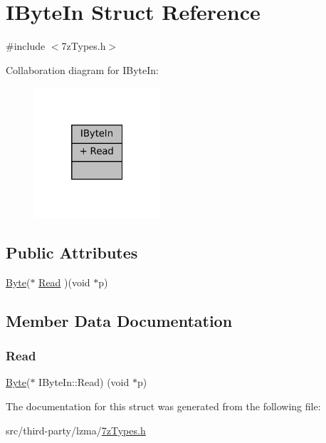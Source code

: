 \hypertarget{struct_i_byte_in}{}\section{I\+Byte\+In Struct Reference}
\label{struct_i_byte_in}


{\ttfamily \#include $<$7z\+Types.\+h$>$}



Collaboration diagram for I\+Byte\+In\+:
\nopagebreak
\begin{figure}[H]
\begin{center}
\leavevmode
\includegraphics[width=133pt]{struct_i_byte_in__coll__graph}
\end{center}
\end{figure}
\subsection*{Public Attributes}
\begin{DoxyCompactItemize}
\item 
\mbox{\hyperlink{7z_types_8h_ae3a497195d617519e5353ea7b417940f}{Byte}}($\ast$ \mbox{\hyperlink{struct_i_byte_in_a7193a567ed16deec96e902f8f63444f1}{Read}} )(void $\ast$p)
\end{DoxyCompactItemize}


\subsection{Member Data Documentation}
\mbox{\label{struct_i_byte_in_a7193a567ed16deec96e902f8f63444f1}} 
\subsubsection{\texorpdfstring{Read}{Read}}
{\footnotesize\ttfamily \mbox{\hyperlink{7z_types_8h_ae3a497195d617519e5353ea7b417940f}{Byte}}($\ast$ I\+Byte\+In\+::\+Read) (void $\ast$p)}



The documentation for this struct was generated from the following file\+:\begin{DoxyCompactItemize}
\item 
src/third-\/party/lzma/\mbox{\hyperlink{7z_types_8h}{7z\+Types.\+h}}\end{DoxyCompactItemize}
